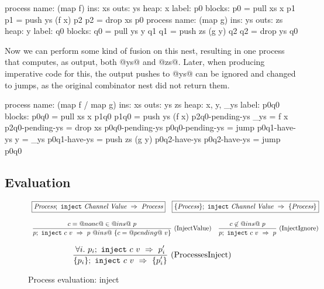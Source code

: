 \begin{code}
process
    name: (map f)
     ins: xs
    outs: ys
    heap: {x}
   label: p0
  blocks: p0 = pull xs    x  p1
          p1 = push ys (f x) p2
          p2 = drop xs       p0
process
    name: (map g)
     ins: ys
    outs: zs
    heap: {y}
   label: q0
  blocks: q0 = pull ys    y  q1
          q1 = push zs (g y) q2
          q2 = drop ys       q0
\end{code}

Now we can perform some kind of fusion on this nest, resulting in one process that computes, as output, both @ys@ and @zs@.
Later, when producing imperative code for this, the output pushes to @ys@ can be ignored and changed to jumps, as the original combinator nest did not return them.

\begin{code}
process
    name: (map f / map g)
     ins: xs
    outs: ys zs
    heap: {x, y, _ys}
   label: p0q0
  blocks: p0q0            = pull xs    x  p1q0
          p1q0            = push ys (f x) p2q0-pending-ys { _ys = f x }
          p2q0-pending-ys = drop xs       p0q0-pending-ys
          p0q0-pending-ys = jump          p0q1-have-ys    { y = _ys }
          p0q1-have-ys    = push zs (g y) p0q2-have-ys
          p0q2-have-ys    = jump          p0q0
\end{code}

\subsection{Evaluation}
\label{s:Process:Eval}

\begin{figure}

$$
\begin{array}{lr} 
  \boxed{\textit{Process};~\texttt{inject}~\textit{Channel}~\textit{Value}~\Rightarrow~\textit{Process}}
 & 
  \boxed{\{ \textit{Process} \};~\texttt{inject}~\textit{Channel}~\textit{Value}~\Rightarrow~\{ \textit{Process} \}}
 \end{array}
$$

$$
\enskip \frac {\displaystyle 
  c=@none@ \in @ins@~p
} {\displaystyle 
  p;~\texttt{inject}~c~v~\Rightarrow~p ~@ins@~ \{ c = @pending@~v\}
} \  \mbox{(InjectValue)} \enskip
\enskip \frac {\displaystyle 
  c \not\in @ins@~p
} {\displaystyle 
  p;~\texttt{inject}~c~v~\Rightarrow~p
} \  \mbox{(InjectIgnore)} \enskip
$$

$$
\enskip \frac {\displaystyle 
  \forall i.~ p_i;~\texttt{inject}~c~v~\Rightarrow~p'_i
} {\displaystyle 
  \{ p_i \};~\texttt{inject}~c~v~\Rightarrow~\{ p'_i \}
} \  \mbox{(ProcessesInject)} \enskip
$$

\caption{Process evaluation: inject}
\label{fig:Process:Eval:Inject}
\end{figure}


